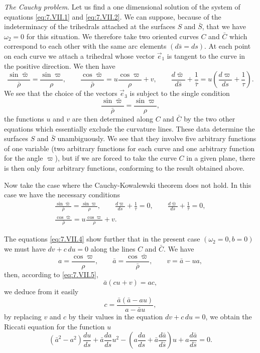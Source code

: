 \documentclass[leqno,11pt]{book}
\numberwithin{equation}{chapter}
\theoremstyle{shape1}
\theoremstyle{shape0}
\theoremstyle{shape2}
\theoremstyle{definition}
\begin{document}
\vspace{12pt}\fsec \emph{The Cauchy problem}. Let us find a one dimensional solution of the system of equations \eqref{eq:7.VII.1} and \eqref{eq:7.VII.2}. We can suppose, because of the indeterminacy of the trihedrals attached at the surfaces $S$ and $\bar S$, that we have $\omega_{2}=0$ for this situation. We therefore take two oriented curves $C$ and $\bar C$ which correspond to each other with the same arc elements $(d\bar s=ds)$. At each point on each curve we attach a trihedral whose vector $\vec e_{1}$ is tangent to the curve in the positive direction. We then have
\[
\frac{\sin\bar\varpi}{\bar\rho}=\frac{\sin\varpi}{\rho},\qquad\frac{\cos\bar\varpi}{\bar\rho}=u\frac{\cos\varpi}{\rho}+v,\qquad\frac{d\bar\varpi}{d\bar s}+\frac{1}{\bar\tau}=u\left(\frac{d\varpi}{ds}+\frac{1}{\tau}\right).
\]
We see that the choice of the vectors $\vec e_{3}$ is subject to the single condition
\[
\frac{\sin\bar\varpi}{\bar\rho}=\frac{\sin\varpi}{\rho},
\]
the functions $u$ and $v$ are then determined along $C$ and $\bar C$ by the two other equations which essentially exclude the curvature lines. These data determine the surfaces $S$ and $\bar S$ unambiguously. We see that they involve five arbitrary functions of one variable (two arbitrary functions for each curve and one arbitrary function for the angle $\varpi$), but if we are forced to take the curve $C$ in a given plane, there is then only four arbitrary functions, conforming to the result obtained above.

Now take the case where the Cauchy-Kowalewski theorem does not hold. In this case we have the necessary conditions
\begin{gather*}
  \frac{\sin\bar\varpi}{\bar\rho}=\frac{\sin\varpi}{\rho},\qquad\frac{d\varpi}{ds}+\frac{1}{\tau}=0,\qquad\frac{d\bar\varpi}{d\bar s}+\frac{1}{\bar\tau}=0,\\
  \frac{\cos\bar\varpi}{\bar\rho}=u\frac{\cos\varpi}{\rho}+v.
\end{gather*}

The equations \eqref{eq:7.VII.4} show further that in the present case $(\omega_{2}=0,b=0)$ we must have $dv+c\,du=0$ along the lines $C$ and $\bar C$. We have
\[
a=\frac{\cos\varpi}{\rho},\qquad\bar a=\frac{\cos\bar\varpi}{\bar\rho},\qquad v=\bar a-ua,
\]
then, according to \eqref{eq:7.VII.5},
\[
\bar a(cu+v)=ac,
\]
we deduce from it easily
\[
c=\frac{\bar a(\bar a -au)}{a-\bar a u},
\]
by replacing $v$ and $c$ by their values in the equation $dv+c\,du=0$, we obtain the Riccati equation for the function $u$
\[
(\bar a^{2}-a^{2})\frac{du}{ds}+\bar a\frac{da}{ds}u^{2}-\left(a\frac{da}{ds}+\bar a\frac{d\bar a}{d\bar s}\right)u+a\frac{d\bar a}{d\bar s}=0.
\]
\end{document}
